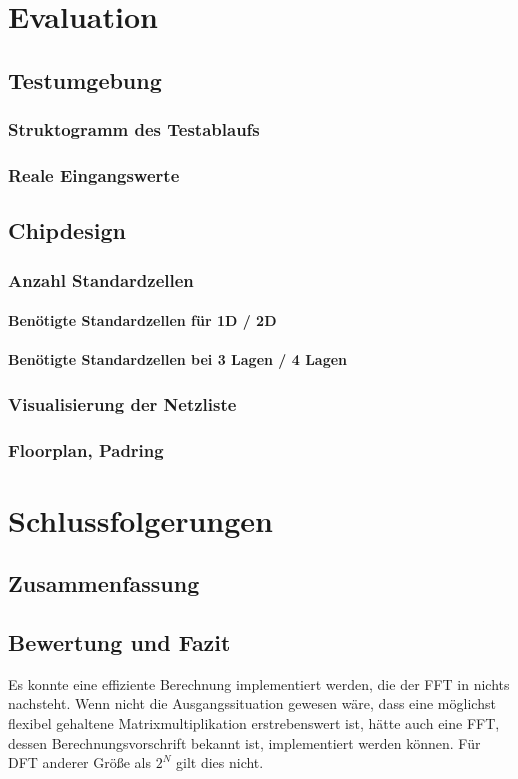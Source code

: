  
 
  
 \chapter{Evaluation}
 


 \section{Testumgebung}
 \subsection{Struktogramm des Testablaufs}
 \subsection{Reale Eingangswerte}
 
 \section{Chipdesign}
 \subsection{Anzahl Standardzellen}
 \subsubsection{Benötigte Standardzellen für 1D / 2D}
 \subsubsection{Benötigte Standardzellen bei 3 Lagen / 4 Lagen}
 \subsection{Visualisierung der Netzliste}
 \subsection{Floorplan, Padring}
 
 \chapter{Schlussfolgerungen}
 \section{Zusammenfassung}
 \section{Bewertung und Fazit}
 Es konnte eine effiziente Berechnung implementiert werden, die der FFT in nichts nachsteht. Wenn nicht die Ausgangssituation gewesen wäre, dass eine möglichst flexibel gehaltene
 Matrixmultiplikation erstrebenswert ist, hätte auch eine FFT, dessen Berechnungsvorschrift bekannt ist, implementiert werden können. Für DFT anderer Größe als $2^N$ gilt dies nicht.
 
